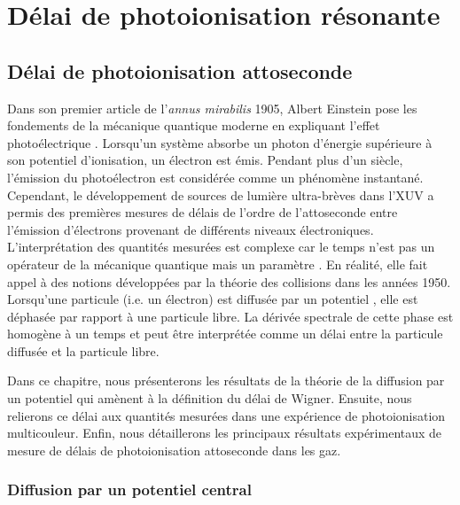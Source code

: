 \part{Délai de photoionisation résonante}
\chapter{Délai de photoionisation attoseconde}
\label{chap:DelaiPI}
Dans son premier article de l'\textit{annus mirabilis} 1905, Albert Einstein pose les fondements de la mécanique quantique moderne en expliquant l'effet photoélectrique . Lorsqu'un système absorbe un photon d'énergie supérieure à son potentiel d'ionisation, un électron est émis. Pendant plus d'un siècle, l'émission du photoélectron est considérée comme un phénomène instantané. Cependant, le développement de sources de lumière ultra-brèves dans l'XUV a permis des premières mesures de délais de l'ordre de l'attoseconde entre l'émission d'électrons provenant de différents niveaux électroniques. L'interprétation des quantités mesurées est complexe car le temps n'est pas un opérateur de la mécanique quantique mais un paramètre . En réalité, elle fait appel à des notions développées par la théorie des collisions dans les années 1950. Lorsqu'une particule (i.e. un électron) est diffusée par un potentiel , elle est déphasée par rapport à une particule libre. La dérivée spectrale de cette phase est homogène à un temps et peut être interprétée comme un délai entre la particule diffusée et la particule libre.

Dans ce chapitre, nous présenterons les résultats de la théorie de la diffusion par un potentiel qui amènent à la définition du délai de Wigner. Ensuite, nous relierons ce délai aux quantités mesurées dans une expérience de photoionisation multicouleur. Enfin, nous détaillerons les principaux résultats expérimentaux de mesure de délais de photoionisation attoseconde dans les gaz.

\section{Diffusion par un potentiel central}
\label{sec:DiffusionPotentielCentral}
